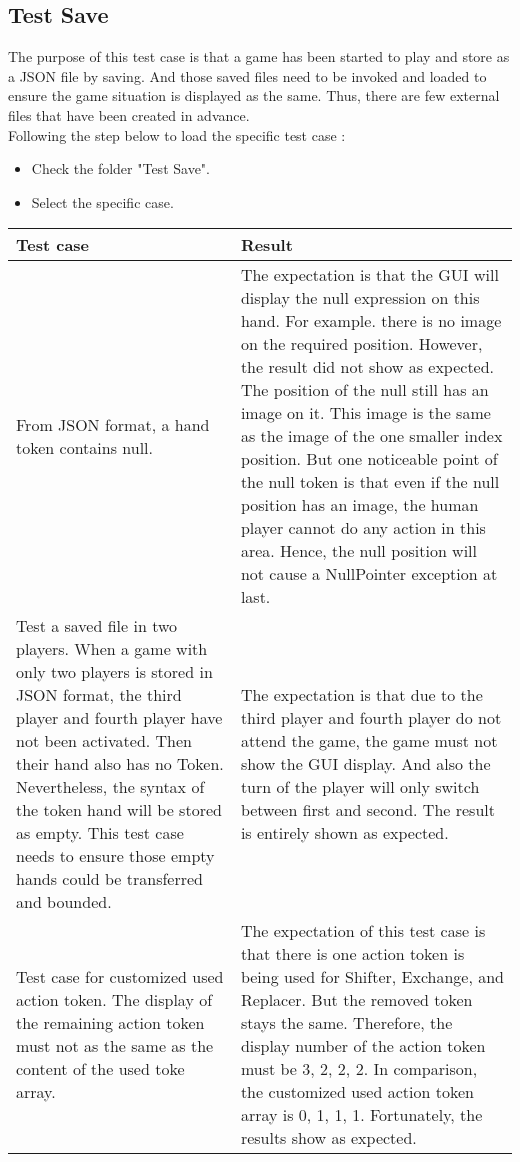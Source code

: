 \subsection{Test Save}

The purpose of this test case is that a game has been started to play and store as a JSON file by saving. And those saved files need to be invoked and loaded to ensure the game situation is displayed as the same. Thus, there are few external files that have been created in advance.\\  


Following the step below to load the specific test case :

\begin{itemize}
	\item Check the folder "Test Save".
	\item Select the specific case.
\end{itemize}


\begin{table}[h]
	\centering
	\begin{tabular}{p{7cm}@{\hskip 5mm}  p{7cm}} 
		\toprule
		Test case   & Result   \\ 
		\midrule
		\midrule
    	From JSON format, a hand token contains null. & The expectation is that the GUI will display the null expression on this hand. For example. there is no image on the required position. However, the result did not show as expected. The position of the null still has an image on it. This image is the same as the image of the one smaller index position. But one noticeable point of the null token is that even if the null position has an image, the human player cannot do any action in this area. Hence, the null position will not cause a NullPointer exception at last. \\ 
    	\midrule
        Test a saved file in two players. When a game with only two players is stored in JSON format, the third player and fourth player have not been activated. Then their hand also has no Token. Nevertheless, the syntax of the token hand will be stored as empty. This test case needs to ensure those empty hands could be transferred and bounded. & The expectation is that due to the third player and fourth player do not attend the game, the game must not show the GUI display. And also the turn of the player will only switch between first and second. 
        The result is entirely shown as expected.  \\
        \midrule
       Test case for customized used action token. The display of the remaining action token must not as the same as the content of the used toke array. & The expectation of this test case is that there is one action token is being used for Shifter, Exchange, and Replacer. But the removed token stays the same. Therefore, the display number of the action token must be {3, 2, 2, 2}. In comparison, the customized used action token array is {0, 1, 1, 1}. Fortunately, the results show as expected. \\
		\bottomrule
	\end{tabular}
\end{table}